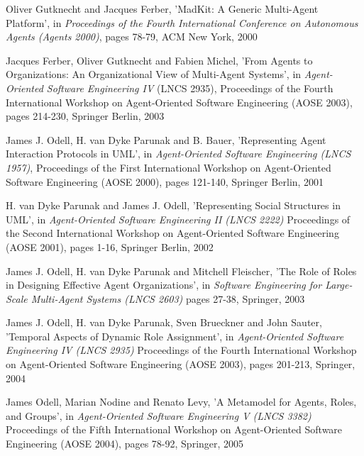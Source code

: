 \begin{thebibliography}{99}
Oliver Gutknecht and Jacques Ferber,
'MadKit: A Generic Multi-Agent Platform',
in \textit{Proceedings of the Fourth International Conference on Autonomous Agents (Agents 2000)},
pages 78-79,
ACM New York, 2000

Jacques Ferber, Oliver Gutknecht and Fabien Michel,
'From Agents to Organizations: An Organizational View of Multi-Agent Systems',
in \textit{Agent-Oriented Software Engineering IV} (LNCS 2935),
Proceedings of the Fourth International Workshop on Agent-Oriented Software Engineering (AOSE 2003),
pages 214-230,
Springer Berlin, 2003


James J. Odell, H. van Dyke Parunak and B. Bauer,
'Representing Agent Interaction Protocols in UML',
in \textit{Agent-Oriented Software Engineering (LNCS 1957)},
Proceedings of the First International Workshop on Agent-Oriented Software Engineering (AOSE 2000),
pages 121-140,
Springer Berlin, 2001

H. van Dyke Parunak and James J. Odell,
'Representing Social Structures in UML',
in \textit{Agent-Oriented Software Engineering II (LNCS 2222)}
Proceedings of the Second International Workshop on Agent-Oriented Software Engineering (AOSE 2001),
pages 1-16,
Springer Berlin, 2002

James J. Odell, H. van Dyke Parunak and Mitchell Fleischer,
'The Role of Roles in Designing Effective Agent Organizations',
in \textit{Software Engineering for Large-Scale Multi-Agent Systems (LNCS 2603)}
pages 27-38,
Springer, 2003

James J. Odell, H. van Dyke Parunak, Sven Brueckner and John Sauter,
'Temporal Aspects of Dynamic Role Assignment',
in \textit{Agent-Oriented Software Engineering IV (LNCS 2935)}
Proceedings of the Fourth International Workshop on Agent-Oriented Software Engineering (AOSE 2003),
pages 201-213,
Springer, 2004

James Odell, Marian Nodine and Renato Levy,
'A Metamodel for Agents, Roles, and Groups',
in \textit{Agent-Oriented Software Engineering V (LNCS 3382)}
Proceedings of the Fifth International Workshop on Agent-Oriented Software Engineering (AOSE 2004),
pages 78-92,
Springer, 2005


\end{thebibliography}
